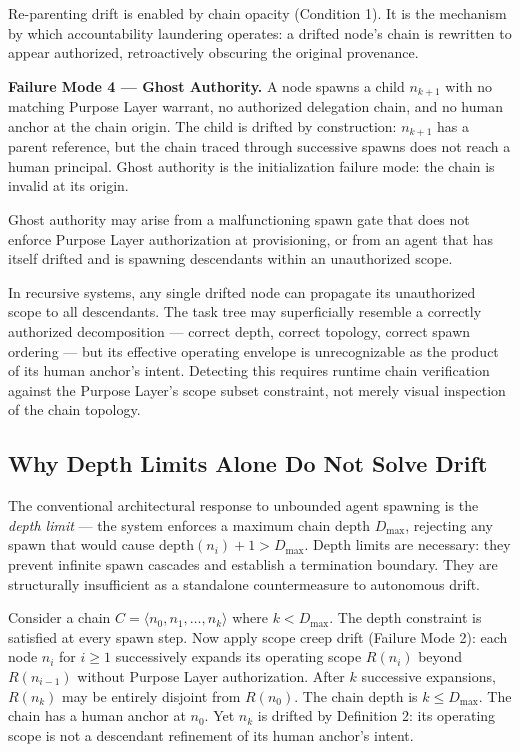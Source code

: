 Re-parenting drift is enabled by chain opacity (Condition 1). It is the mechanism by which accountability laundering operates: a drifted node's chain is rewritten to appear authorized, retroactively obscuring the original provenance.

\medskip
\noindent\textbf{Failure Mode 4 — Ghost Authority.} A node spawns a child $n_{k+1}$ with no matching Purpose Layer warrant, no authorized delegation chain, and no human anchor at the chain origin. The child is drifted by construction: $n_{k+1}$ has a parent reference, but the chain traced through successive spawns does not reach a human principal. Ghost authority is the initialization failure mode: the chain is invalid at its origin.

Ghost authority may arise from a malfunctioning spawn gate that does not enforce Purpose Layer authorization at provisioning, or from an agent that has itself drifted and is spawning descendants within an unauthorized scope.

\medskip
In recursive systems, any single drifted node can propagate its unauthorized scope to all descendants. The task tree may superficially resemble a correctly authorized decomposition — correct depth, correct topology, correct spawn ordering — but its effective operating envelope is unrecognizable as the product of its human anchor's intent. Detecting this requires runtime chain verification against the Purpose Layer's scope subset constraint, not merely visual inspection of the chain topology.

\subsection{Why Depth Limits Alone Do Not Solve Drift}

The conventional architectural response to unbounded agent spawning is the \emph{depth limit} — the system enforces a maximum chain depth $D_{\max}$, rejecting any spawn that would cause $\text{depth}(n_i) + 1 > D_{\max}$. Depth limits are necessary: they prevent infinite spawn cascades and establish a termination boundary. They are structurally insufficient as a standalone countermeasure to autonomous drift.

Consider a chain $C = \langle n_0, n_1, \ldots, n_k \rangle$ where $k < D_{\max}$. The depth constraint is satisfied at every spawn step. Now apply scope creep drift (Failure Mode 2): each node $n_i$ for $i \geq 1$ successively expands its operating scope $R(n_i)$ beyond $R(n_{i-1})$ without Purpose Layer authorization. After $k$ successive expansions, $R(n_k)$ may be entirely disjoint from $R(n_0)$. The chain depth is $k \leq D_{\max}$. The chain has a human anchor at $n_0$. Yet $n_k$ is drifted by Definition 2: its operating scope is not a descendant refinement of its human anchor's intent.

